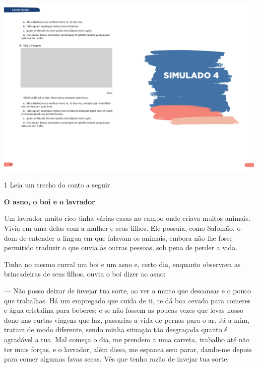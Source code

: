\begin{myquote}
\begin{myescolha}
\vspace*{-3.4cm}
\hspace*{-3.7cm}\includegraphics[scale=1]{../watermarks/4simulado5ano.pdf}
\pagebreak

\num{1} Leia um trecho do conto a seguir.

\begin{myquote}
\textbf{O asno, o boi e o lavrador}

Um lavrador muito rico tinha várias casas no campo onde criava muitos
animais. Vivia em uma delas com a mulher e seus filhos. Ele possuía,
como Salomão, o dom de entender a língua em que falavam os animais,
embora não lhe fosse permitido traduzir o que ouvia às outras pessoas,
sob pena de perder a vida.

Tinha no mesmo curral um boi e um asno e, certo dia, enquanto observava
as brincadeiras de seus filhos, ouviu o boi dizer ao asno:

--- Não posso deixar de invejar tua sorte, ao ver o muito que descansas e
o pouco que trabalhas. Há um empregado que cuida de ti, te dá boa cevada
para comeres e água cristalina para beberes; e se não fossem as poucas
vezes que levas nosso dono nas curtas viagens que faz, passarias a vida
de pernas para o ar. Já a mim, tratam de modo diferente, sendo minha
situação tão desgraçada quanto é agradável a tua. Mal começa o dia, me
prendem a uma carreta, trabalho até não ter mais forças, e o lavrador,
além disso, me espanca sem parar, dando-me depois para comer algumas
favas secas. Vês que tenho razão de invejar tua sorte.

\end{myquote}


\end{myescolha}
\end{myquote}
